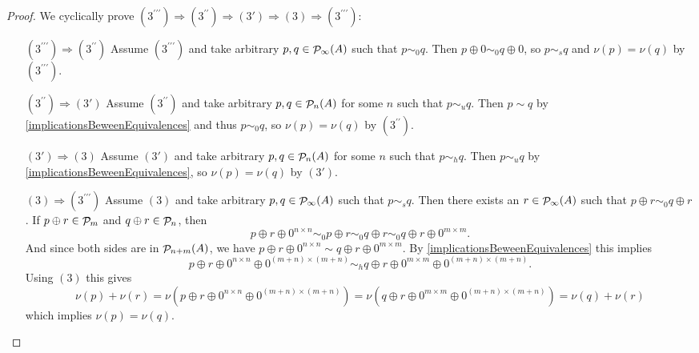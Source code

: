 \begin{proof}
We cyclically prove $(3^{\prime\prime\prime}) \Rightarrow (3^{\prime\prime}) \Rightarrow (3') \Rightarrow (3) \Rightarrow (3^{\prime\prime\prime})$:
\begin{enumerate}
\item[$\boxed{(3^{\prime\prime\prime}) \Rightarrow (3^{\prime\prime})}$] Assume $(3^{\prime\prime\prime})$ and take arbitrary $p,q\in\mathop{\mathcal{P}}\nolimits_\infty(A)$ such that $p\sim_0 q$. Then $p\oplus 0 \sim_0 q\oplus 0$, so $p\sim_s q$ and $\nu(p)=\nu(q)$ by $(3^{\prime\prime\prime})$.
\item[$\boxed{(3^{\prime\prime}) \Rightarrow (3')}$] Assume $(3^{\prime\prime})$ and take arbitrary $p,q\in\mathop{\mathcal{P}}\nolimits_n(A)$ for some $n$ such that $p\sim_u q$. Then $p\sim q$ by \ref{implicationsBeweenEquivalences} and thus $p\sim_0 q$, so $\nu(p)=\nu(q)$ by $(3^{\prime\prime})$.
\item[$\boxed{(3') \Rightarrow (3)}$] Assume $(3')$ and take arbitrary $p,q\in\mathop{\mathcal{P}}\nolimits_n(A)$ for some $n$ such that $p\sim_h q$. Then $p\sim_u q$ by \ref{implicationsBeweenEquivalences}, so $\nu(p)=\nu(q)$ by $(3')$.
\item[$\boxed{(3) \Rightarrow (3^{\prime\prime\prime})}$] Assume $(3)$ and take arbitrary $p,q\in\mathop{\mathcal{P}}\nolimits_\infty(A)$ such that $p\sim_s q$. Then there exists an $r\in\mathop{\mathcal{P}}\nolimits_\infty(A)$ such that $p\oplus r \sim_0 q\oplus r$. If $p\oplus r\in\mathop{\mathcal{P}}\nolimits_m$ and $q\oplus r\in\mathop{\mathcal{P}}\nolimits_n$, then
\[ p \oplus r\oplus 0^{n\times n} \sim_0 p\oplus r \sim_0 q\oplus r \sim_0 q\oplus r\oplus 0^{m\times m}. \]
And since both sides are in $\mathop{\mathcal{P}}\nolimits_{n+m}(A)$, we have $p \oplus r\oplus 0^{n\times n} \sim q\oplus r\oplus 0^{m\times m}$. By \ref{implicationsBeweenEquivalences} this implies
\[ p \oplus r\oplus 0^{n\times n}\oplus 0^{(m+n)\times(m+n)} \sim_h q\oplus r\oplus 0^{m\times m}\oplus 0^{(m+n)\times(m+n)}. \]
Using $(3)$ this gives
\[ \nu(p) + \nu(r) = \nu(p \oplus r\oplus 0^{n\times n}\oplus 0^{(m+n)\times(m+n)}) = \nu(q\oplus r\oplus 0^{m\times m}\oplus 0^{(m+n)\times(m+n)}) = \nu(q) +\nu(r) \]
which implies $\nu(p) = \nu(q)$.
\end{enumerate}
\end{proof}


